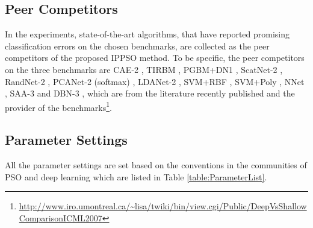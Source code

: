 \documentclass[conference]{IEEEtran}
\begin{document}
\subsection{Peer Competitors}\label{secpeer-competitors}

In the experiments, state-of-the-art algorithms, that have reported promising classification errors on the chosen benchmarks, are collected as the peer competitors of the proposed IPPSO method. To be specific, the peer competitors on the three benchmarks are CAE-2 \cite{CAE:Rifai}, TIRBM \cite{TIRBM:Sohn}, PGBM+DN1 \cite{PGBMDN1:Sohn}, ScatNet-2 \cite{ScatteringCNN:Bruna}, RandNet-2 \cite{DLBaseline:Chan}, PCANet-2 (softmax) \cite{DLBaseline:Chan}, LDANet-2 \cite{DLBaseline:Chan}, SVM+RBF \cite{DeepArchitectureEval:Larochelle}, SVM+Poly \cite{DeepArchitectureEval:Larochelle}, NNet \cite{DeepArchitectureEval:Larochelle}, SAA-3 \cite{DeepArchitectureEval:Larochelle} and DBN-3 \cite{DeepArchitectureEval:Larochelle}, which are from the literature \cite{DLBaseline:Chan} recently published and the provider of the benchmarks\footnote{\url{http://www.iro.umontreal.ca/~lisa/twiki/bin/view.cgi/Public/DeepVsShallowComparisonICML2007}}.

\subsection{Parameter Settings}

All the parameter settings are set based on the conventions in the communities of PSO \cite{PSOEPSettings:Van} and deep learning \cite{DLGuide:Hinton} which are listed in Table \ref{table:ParameterList}. 
\end{document}
